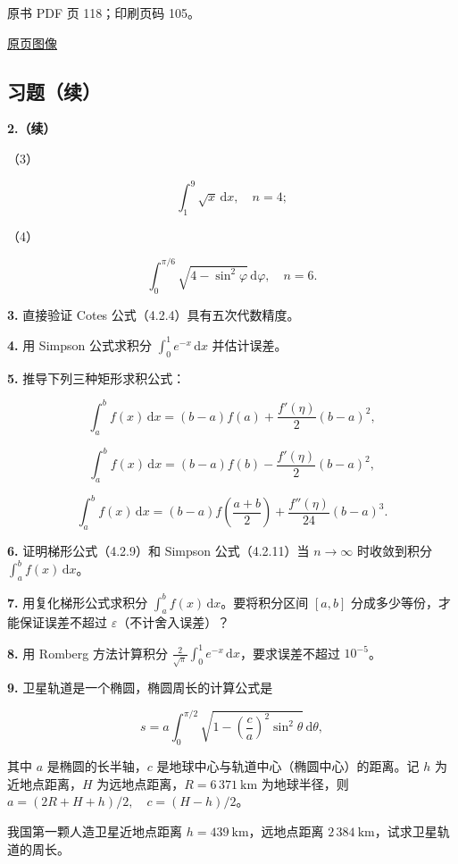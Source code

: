 \clearpage

原书 PDF 页 118；印刷页码 105。

\href{source-images/pdf-118.jpeg}{原页图像}

\subsection{习题（续）}\label{ch04b-ux4e60ux9898ux7eed}

\textbf{2.（续）}

（3）

\[
\int_1^9\sqrt{x}\,\mathrm{d}x,\quad n=4;
\]

（4）

\[
\int_0^{\pi/6}\sqrt{4-\sin^2\varphi}\,\mathrm{d}\varphi,\quad n=6.
\]

\textbf{3.} 直接验证 Cotes 公式（4.2.4）具有五次代数精度。

\textbf{4.} 用 Simpson 公式求积分 \(\displaystyle\int_0^1 e^{-x}\,\mathrm{d}x\) 并估计误差。

\textbf{5.} 推导下列三种矩形求积公式：

\[
\int_a^b f(x)\,\mathrm{d}x=(b-a)f(a)+\frac{f'(\eta)}2(b-a)^2,
\]

\[
\int_a^b f(x)\,\mathrm{d}x=(b-a)f(b)-\frac{f'(\eta)}2(b-a)^2,
\]

\[
\int_a^b f(x)\,\mathrm{d}x=(b-a)f\left(\frac{a+b}2\right)+\frac{f''(\eta)}{24}(b-a)^3.
\]

\textbf{6.} 证明梯形公式（4.2.9）和 Simpson 公式（4.2.11）当 \(n\to\infty\) 时收敛到积分 \(\displaystyle\int_a^b f(x)\,\mathrm{d}x\)。

\textbf{7.} 用复化梯形公式求积分 \(\displaystyle\int_a^b f(x)\,\mathrm{d}x\)。要将积分区间 \([a,b]\) 分成多少等份，才能保证误差不超过 \(\varepsilon\)（不计舍入误差）？

\textbf{8.} 用 Romberg 方法计算积分 \(\displaystyle\frac2{\sqrt\pi}\int_0^1 e^{-x}\,\mathrm{d}x\)，要求误差不超过 \(10^{-5}\)。

\textbf{9.} 卫星轨道是一个椭圆，椭圆周长的计算公式是

\[
s=a\int_0^{\pi/2}\sqrt{1-\left(\frac ca\right)^2\sin^2\theta}\,\mathrm{d}\theta,
\]

其中 \(a\) 是椭圆的长半轴，\(c\) 是地球中心与轨道中心（椭圆中心）的距离。记 \(h\) 为近地点距离，\(H\) 为远地点距离，\(R=6\,371\ \mathrm{km}\) 为地球半径，则 \(a=(2R+H+h)/2,\quad c=(H-h)/2\)。

我国第一颗人造卫星近地点距离 \(h=439\ \mathrm{km}\)，远地点距离 \(2\,384\ \mathrm{km}\)，试求卫星轨道的周长。

